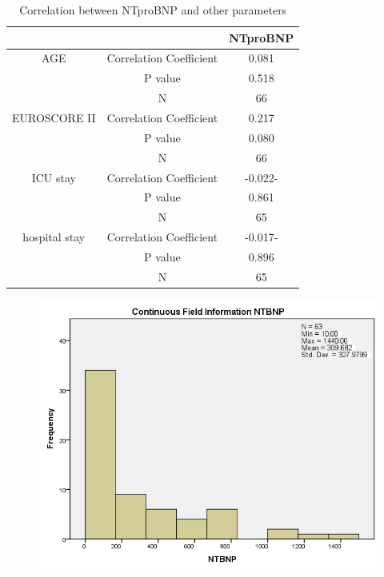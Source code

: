 \documentclass[14pt,a4paper,onecolumn]{extarticle}
\begin{document}
\begin{table}[]
\centering
\caption{Correlation between NTproBNP and other parameters}
\label{Result_correl_parameters}
\begin{tabular}{ccc}
    \hline
                 &                         & NTproBNP \\\hline
AGE              & Correlation Coefficient & 0.081     \\
                 & P value                 & 0.518     \\
                 & N                       & 66       \\
EUROSCORE II     & Correlation Coefficient & 0.217     \\
                 & P value                 & 0.080     \\
                 & N                       & 66       \\
ICU stay         & Correlation Coefficient & -0.022-   \\
                 & P value                 & 0.861     \\
                 & N                       & 65       \\
hospital stay    & Correlation Coefficient & -0.017-   \\
                 & P value                 & 0.896     \\
                 & N                       & 65

\end{tabular}
\end{table}

\clearpage
\begin{figure}
    \centering
    \includegraphics[scale=0.7]{../images/cont_ntprobnp.png}
    \small\caption{}
    \label{}
\end{figure}
\end{document}
